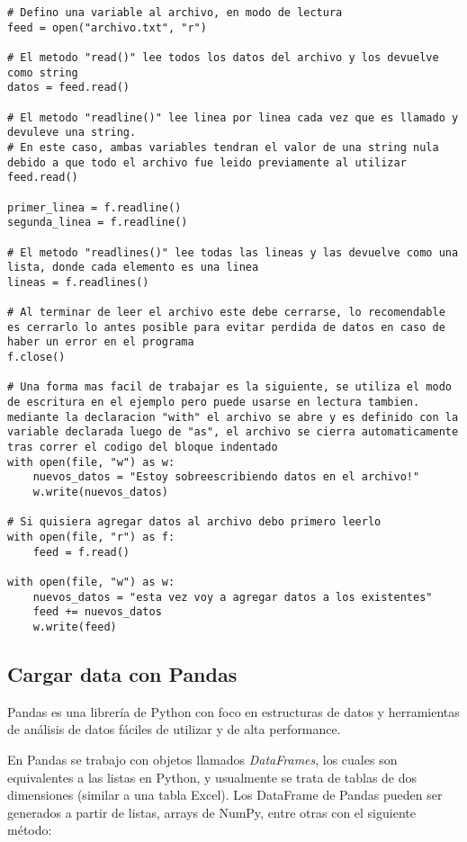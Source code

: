 \documentclass[10pt,a4paper]{article}
\begin{document}
\begin{lstlisting}[caption={Leer y escribir datos de un archivo}]
# Defino una variable al archivo, en modo de lectura
feed = open("archivo.txt", "r")

# El metodo "read()" lee todos los datos del archivo y los devuelve como string
datos = feed.read()

# El metodo "readline()" lee linea por linea cada vez que es llamado y devuleve una string.
# En este caso, ambas variables tendran el valor de una string nula debido a que todo el archivo fue leido previamente al utilizar feed.read()

primer_linea = f.readline()
segunda_linea = f.readline()

# El metodo "readlines()" lee todas las lineas y las devuelve como una lista, donde cada elemento es una linea
lineas = f.readlines()

# Al terminar de leer el archivo este debe cerrarse, lo recomendable es cerrarlo lo antes posible para evitar perdida de datos en caso de haber un error en el programa
f.close()

# Una forma mas facil de trabajar es la siguiente, se utiliza el modo de escritura en el ejemplo pero puede usarse en lectura tambien. mediante la declaracion "with" el archivo se abre y es definido con la variable declarada luego de "as", el archivo se cierra automaticamente tras correr el codigo del bloque indentado
with open(file, "w") as w:
    nuevos_datos = "Estoy sobreescribiendo datos en el archivo!"
    w.write(nuevos_datos)

# Si quisiera agregar datos al archivo debo primero leerlo
with open(file, "r") as f:
    feed = f.read()

with open(file, "w") as w:
    nuevos_datos = "esta vez voy a agregar datos a los existentes"
    feed += nuevos_datos
    w.write(feed) 
\end{lstlisting}
\subsection{Cargar data con Pandas}
Pandas es una librería de Python con foco en estructuras de datos y herramientas de análisis de datos fáciles de utilizar y de alta performance.\cite{pandas}

En Pandas se trabajo con objetos llamados \emph{DataFrames}, los cuales son equivalentes a las listas en Python, y usualmente se trata de tablas de dos dimensiones (similar a una tabla Excel). Los DataFrame de Pandas pueden ser generados a partir de listas, arrays de NumPy, entre otras con el siguiente método:
\end{document}
